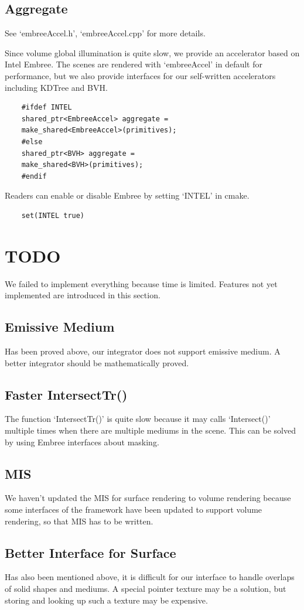 \documentclass[acmtog]{acmart}
\begin{document}
\subsection{Aggregate}
See `embreeAccel.h', `embreeAccel.cpp' for more details.\par
Since volume global illumination is quite slow, we provide an accelerator based on Intel Embree.
The scenes are rendered with `embreeAccel' in default for performance, 
but we also provide interfaces for our self-written accelerators including KDTree and BVH.
\begin{lstlisting}
	#ifdef INTEL
	shared_ptr<EmbreeAccel> aggregate = 
	make_shared<EmbreeAccel>(primitives);
	#else
	shared_ptr<BVH> aggregate = 
	make_shared<BVH>(primitives);
	#endif
\end{lstlisting}
Readers can enable or disable Embree by setting `INTEL' in cmake.
\begin{lstlisting}
	set(INTEL true)
\end{lstlisting}

\section{TODO}
We failed to implement everything because time is limited.
Features not yet implemented are introduced in this section.
\subsection{Emissive Medium}
Has been proved above, our integrator does not support emissive medium.
A better integrator should be mathematically proved.
\subsection{Faster IntersectTr()}
The function `IntersectTr()' is quite slow because it may calls `Intersect()' multiple times when there are multiple mediums in the scene.
This can be solved by using Embree interfaces about masking.
\subsection{MIS}
We haven't updated the MIS for surface rendering to volume rendering because
some interfaces of the framework have been updated to support volume rendering, 
so that MIS has to be written.
\subsection{Better Interface for Surface}
Has also been mentioned above, it is difficult for our interface to handle overlaps of solid shapes and mediums.
A special pointer texture may be a solution, but storing and looking up such a texture may be expensive.
\end{document}
